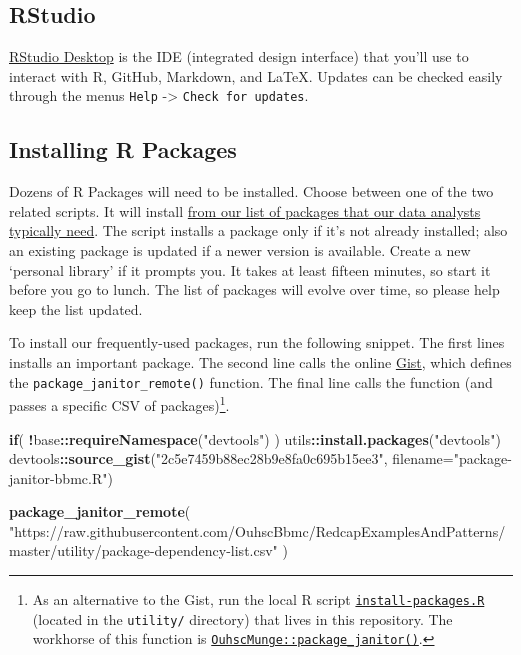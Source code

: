 \documentclass[
]{book}
\newenvironment{Shaded}{\begin{snugshade}}{\end{snugshade}}
\newcommand{\ControlFlowTok}[1]{\textcolor[rgb]{0.13,0.29,0.53}{\textbf{#1}}}
\newcommand{\DataTypeTok}[1]{\textcolor[rgb]{0.13,0.29,0.53}{#1}}
\newcommand{\KeywordTok}[1]{\textcolor[rgb]{0.13,0.29,0.53}{\textbf{#1}}}
\newcommand{\NormalTok}[1]{#1}
\newcommand{\OperatorTok}[1]{\textcolor[rgb]{0.81,0.36,0.00}{\textbf{#1}}}
\newcommand{\StringTok}[1]{\textcolor[rgb]{0.31,0.60,0.02}{#1}}
\begin{document}
\hypertarget{rstudio}{%
\subsection{RStudio}\label{rstudio}}

\href{http://www.rstudio.com/ide/download/desktop}{RStudio Desktop} is the IDE (integrated design interface) that you'll use to interact with R, GitHub, Markdown, and LaTeX. Updates can be checked easily through the menus \texttt{Help} -\textgreater{} \texttt{Check\ for\ updates}.

\hypertarget{installing-r-packages}{%
\subsection{Installing R Packages}\label{installing-r-packages}}

Dozens of R Packages will need to be installed. Choose between one of the two related scripts. It will install \href{https://github.com/OuhscBbmc/RedcapExamplesAndPatterns/blob/master/utility/package-dependency-list.csv}{from our list of packages that our data analysts typically need}. The script installs a package only if it's not already installed; also an existing package is updated if a newer version is available. Create a new `personal library' if it prompts you. It takes at least fifteen minutes, so start it before you go to lunch. The list of packages will evolve over time, so please help keep the list updated.

To install our frequently-used packages, run the following snippet. The first lines installs an important package. The second line calls the online \href{https://gist.github.com/wibeasley/2c5e7459b88ec28b9e8fa0c695b15ee3}{Gist}, which defines the \texttt{package\_janitor\_remote()} function. The final line calls the function (and passes a specific CSV of packages)\footnote{As an alternative to the Gist, run the local R script \href{https://github.com/OuhscBbmc/RedcapExamplesAndPatterns/blob/master/utility/install-packages.R}{\texttt{install-packages.R}} (located in the \texttt{utility/} directory) that lives in this repository. The workhorse of this function is \href{https://github.com/OuhscBbmc/OuhscMunge/blob/master/R/package-janitor.R}{\texttt{OuhscMunge::package\_janitor()}}.}.

\begin{Shaded}
\begin{Highlighting}[]
\ControlFlowTok{if}\NormalTok{( }\OperatorTok{!}\NormalTok{base}\OperatorTok{::}\KeywordTok{requireNamespace}\NormalTok{(}\StringTok{"devtools"}\NormalTok{) ) utils}\OperatorTok{::}\KeywordTok{install.packages}\NormalTok{(}\StringTok{"devtools"}\NormalTok{)}
\NormalTok{devtools}\OperatorTok{::}\KeywordTok{source\_gist}\NormalTok{(}\StringTok{"2c5e7459b88ec28b9e8fa0c695b15ee3"}\NormalTok{, }\DataTypeTok{filename=}\StringTok{"package{-}janitor{-}bbmc.R"}\NormalTok{)}

\KeywordTok{package\_janitor\_remote}\NormalTok{(}
  \StringTok{"https://raw.githubusercontent.com/OuhscBbmc/RedcapExamplesAndPatterns/master/utility/package{-}dependency{-}list.csv"}
\NormalTok{)        }
\end{Highlighting}
\end{Shaded}
\end{document}
